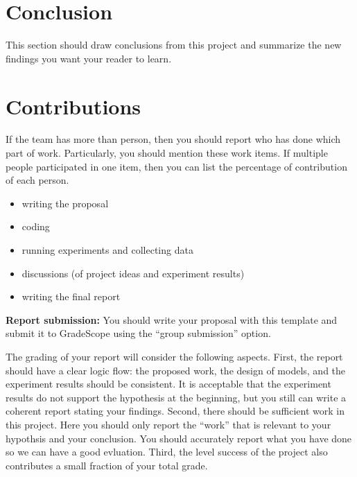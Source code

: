 \documentclass[11pt]{article}
\begin{document}
\section{Conclusion}

This section should draw conclusions from this project and summarize the new findings you want your reader to learn.  

\section{Contributions}

If the team has more than person, then you should report who has done which part of work. Particularly, you should mention these work items. If multiple people participated in one item, then you can list the percentage of contribution of each person. 

\begin{itemize}
\item writing the proposal 
\item coding
\item running experiments and collecting data 
\item discussions (of project ideas and experiment results) 
\item writing the final report 
\end{itemize}


\noindent \textbf{Report submission:}  You should write your proposal with this template and submit it to GradeScope using the ``group submission'' option. 

The grading of your report will consider the following aspects. First, the report should have a clear logic flow: the proposed work, the design of models, and the experiment results should be consistent. It is acceptable that the experiment results do not support the hypothesis at the beginning, but you still can write a coherent report stating your findings. Second, there should be sufficient work in this project. Here you should only report the ``work'' that is relevant to your hypothsis and your conclusion. You should accurately report what you have done so we can have a good evluation. Third, the level success of the project also contributes a small fraction of your total grade.  



\end{document}
